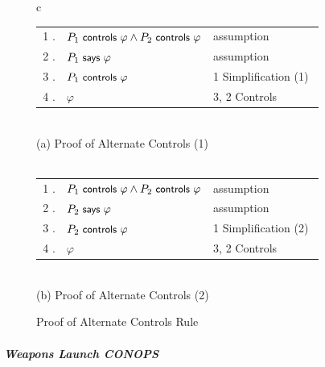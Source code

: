 \begin{figure}[t]
  \centering
  \begin{tabular}{c}
  \begin{minipage}{0.8\linewidth}
    \begin{center}
      \begin{tabular}{|r<{.}>{$}p{0.45\linewidth}<{$}l|}
        \hline
        1 & P_1 \controls \varphi \wedge P_2 \controls \varphi & assumption\\
        2 & P_1 \says \varphi & assumption\\
        3 & P_1 \controls \varphi & 1 Simplification (1)\\
        4 & \varphi & 3, 2 Controls\\
        \hline
      \end{tabular}
    \end{center}
  \end{minipage}\\
  (a) Proof of Alternate Controls (1) \\
  \\
  \begin{minipage}{0.8\linewidth}
    \begin{center}
      \begin{tabular}{|r<{.}>{$}p{0.45\linewidth}<{$}l|}
        \hline
        1 & P_1 \controls \varphi \wedge P_2 \controls \varphi & assumption\\
        2 & P_2 \says \varphi & assumption\\
        3 & P_2 \controls \varphi & 1 Simplification (2)\\
        4 & \varphi & 3, 2 Controls\\
        \hline
      \end{tabular}
    \end{center}
  \end{minipage}\\
  (b) Proof of Alternate Controls (2)
\end{tabular}
  \caption{Proof of Alternate Controls Rule}
  \label{fig:alternate-controls-proof}
\end{figure}

\subparagraph*{Weapons Launch CONOPS}

